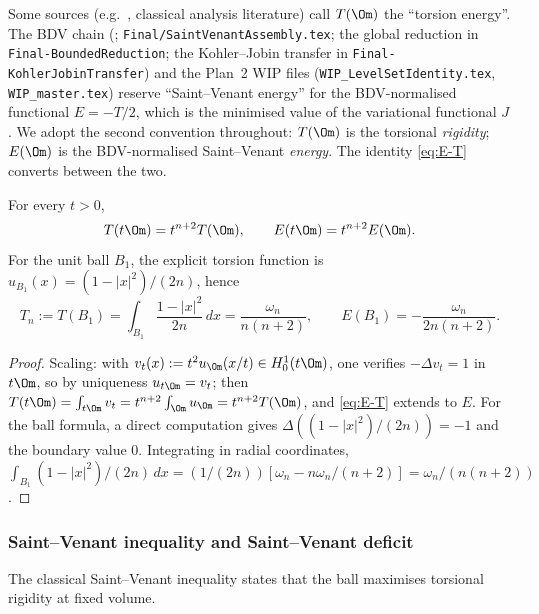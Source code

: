 \begin{remark}\label{rem:T-vs-E}
Some sources (e.g.\ \cite[\S1]{Talenti1976}, classical analysis
literature) call $T(\Om)$ the ``torsion energy''. The BDV chain
(\cite{BDV}; \texttt{Final/SaintVenantAssembly.tex}; the global
reduction in \texttt{Final-BoundedReduction}; the Kohler--Jobin
transfer in \texttt{Final-KohlerJobinTransfer}) and the Plan~2
WIP files (\texttt{WIP\_LevelSetIdentity.tex},
\texttt{WIP\_master.tex}) reserve ``Saint--Venant energy'' for the
BDV-normalised functional $E=-T/2$, which is the minimised value of
the variational functional $J$. We adopt the second convention
throughout: $T(\Om)$ is the torsional \emph{rigidity}; $E(\Om)$ is
the BDV-normalised Saint--Venant \emph{energy}. The identity
\eqref{eq:E-T} converts between the two.
\end{remark}

\begin{lemma}\label{lem:Tscaling}
For every $t>0$,
\begin{equation}\label{eq:Tscaling}
   T(t\Om)=t^{n+2}T(\Om),\qquad E(t\Om)=t^{n+2}E(\Om).
\end{equation}
For the unit ball $B_1$, the explicit torsion function is
$u_{B_1}(x)=(1-|x|^2)/(2n)$, hence
\begin{equation}\label{eq:Tn}
   T_n:=T(B_1)=\int_{B_1}\frac{1-|x|^2}{2n}\,dx=\frac{\omega_n}{n(n+2)},
   \qquad E(B_1)=-\frac{\omega_n}{2n(n+2)}.
\end{equation}
\end{lemma}

\begin{proof}
Scaling: with $v_t(x):=t^2 u_\Om(x/t)\in H^1_0(t\Om)$, one verifies
$-\Delta v_t=1$ in $t\Om$, so by uniqueness $u_{t\Om}=v_t$; then
$T(t\Om)=\int_{t\Om}v_t=t^{n+2}\int_\Om u_\Om=t^{n+2}T(\Om)$, and
\eqref{eq:E-T} extends to $E$. For the ball formula, a direct
computation gives $\Delta((1-|x|^2)/(2n))=-1$ and the boundary
value $0$. Integrating in radial coordinates,
$\int_{B_1}(1-|x|^2)/(2n)\,dx
=(1/(2n))[\omega_n-n\omega_n/(n+2)]=\omega_n/(n(n+2))$.
\end{proof}

\subsubsection{Saint--Venant inequality and Saint--Venant deficit}
\label{ssec:SV-deficit}

The classical Saint--Venant inequality
\cite[Thm.~3.3]{PolyaSzego1951} states that the ball maximises torsional
rigidity at fixed volume.

